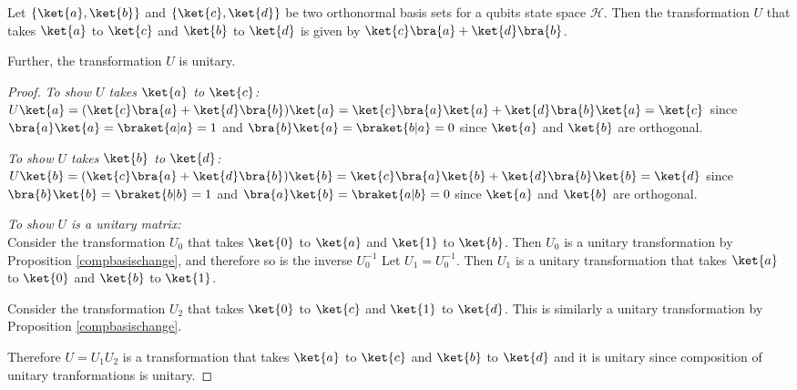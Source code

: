 \begin{prop}
    Let $\{ \ket{a}, \ket{b} \}$ and $\{ \ket{c}, \ket{d} \}$ be two orthonormal basis sets for a qubits state space $\mathcal{H}$. Then the transformation $U$ that takes $\ket{a}$ to $\ket{c}$ and $\ket{b}$ to $\ket{d}$ is given by $\ket{c}\bra{a} + \ket{d}\bra{b}$.

    Further, the transformation $U$ is unitary.
\end{prop}
\begin{proof}
    \emph{To show $U$ takes $\ket{a}$ to $\ket{c}$: }\\
    $U \ket{a} = (\ket{c}\bra{a} + \ket{d}\bra{b}) \ket{a} = \ket{c} \bra{a} \ket{a} + \ket{d} \bra{b} \ket{a} = \ket{c}$ since $\bra{a} \ket{a} = \braket{a|a} = 1$ and $\bra{b} \ket{a} = \braket{b|a} = 0$ since $\ket{a}$ and $\ket{b}$ are orthogonal.

    \emph{To show $U$ takes $\ket{b}$ to $\ket{d}$: } \\
    $U \ket{b} = (\ket{c}\bra{a} + \ket{d}\bra{b}) \ket{b} = \ket{c} \bra{a} \ket{b} + \ket{d} \bra{b} \ket{b} = \ket{d}$ since $\bra{b} \ket{b} = \braket{b|b} = 1$ and $\bra{a} \ket{b} = \braket{a|b} = 0$ since $\ket{a}$ and $\ket{b}$ are orthogonal.

    \emph{To show $U$ is a unitary matrix:} \\
    Consider the transformation $U_0$ that takes $\ket{0}$ to $\ket{a}$ and $\ket{1}$ to $\ket{b}$.
    Then $U_0$ is a unitary transformation by Proposition \ref{compbasischange}, and therefore so is the inverse $U_0^{-1}$
    Let $U_1 = U_0^{-1}$. Then $U_1$ is a unitary transformation that takes $\ket{a}$ to $\ket{0}$ and $\ket{b}$ to $\ket{1}$.

    Consider the transformation $U_2$ that takes $\ket{0}$ to $\ket{c}$ and $\ket{1}$ to $\ket{d}$. This is similarly a unitary transformation by Proposition \ref{compbasischange}.

    Therefore $U = U_1 U_2$ is a transformation that takes $\ket{a}$ to $\ket{c}$ and $\ket{b}$ to $\ket{d}$ and it is unitary since composition of unitary tranformations is unitary.
\end{proof}
